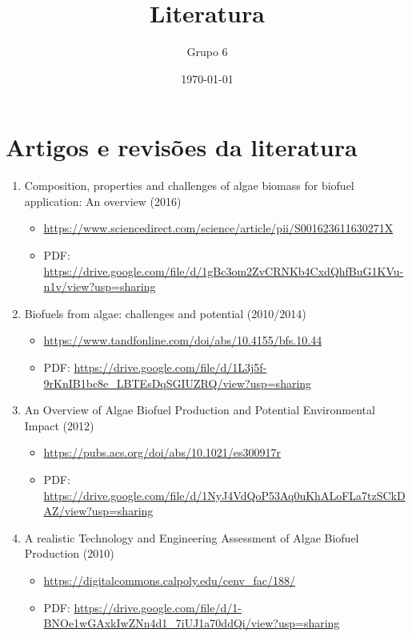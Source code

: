 \documentclass[11pt]{article}
\author{Grupo 6}
\date{\today}
\title{Literatura}
\begin{document}
\maketitle
\clearpage
\tableofcontents
\clearpage


\section{Artigos e revisões da literatura}
\label{sec:orgbf0315b}
\begin{enumerate}
  \item Composition, properties and challenges of algae biomass for biofuel application: An overview (2016)
        \begin{itemize}
          \item \url{https://www.sciencedirect.com/science/article/pii/S001623611630271X}
          \item PDF: \url{https://drive.google.com/file/d/1gBc3om2ZvCRNKb4CxdQhfBuG1KVu-n1v/view?usp=sharing}
        \end{itemize}
  \item Biofuels from algae: challenges and potential (2010/2014)
        \begin{itemize}
          \item \url{https://www.tandfonline.com/doi/abs/10.4155/bfs.10.44}
          \item PDF: \url{https://drive.google.com/file/d/1L3j5f-9rKnIB1bc8e\_LBTEsDqSGIUZRQ/view?usp=sharing}
        \end{itemize}
  \item An Overview of Algae Biofuel Production and Potential Environmental Impact (2012)
        \begin{itemize}
          \item \url{https://pubs.acs.org/doi/abs/10.1021/es300917r}
          \item PDF: \url{https://drive.google.com/file/d/1NyJ4VdQoP53Aq0uKhALoFLa7tzSCkDAZ/view?usp=sharing}
        \end{itemize}
  \item A realistic Technology and Engineering Assessment of Algae Biofuel Production (2010)
        \begin{itemize}
          \item \url{https://digitalcommons.calpoly.edu/cenv\_fac/188/}
          \item PDF: \url{https://drive.google.com/file/d/1-BNOe1wGAxkIwZNn4d1\_7iUJ1a70ddQi/view?usp=sharing}
        \end{itemize}

\end{enumerate}
\end{document}
